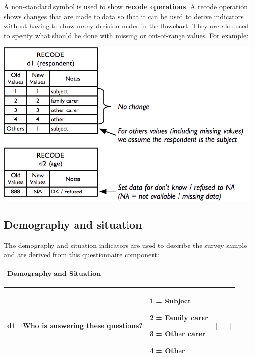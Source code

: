\documentclass[12pt,a4paper]{book}
\theoremstyle{definition}
\theoremstyle{definition}
\theoremstyle{definition}
\theoremstyle{remark}
\begin{document}
A non-standard symbol is used to show \textbf{recode operations}. A
recode operation shows changes that are made to data so that it can be
used to derive indicators without having to show many decision nodes in
the flowchart. They are also used to specify what should be done with
missing or out-of-range values. For example:

\begin{center}\includegraphics{figures/indicators02} \end{center}

\hypertarget{demography-and-situation}{%
\subsection{Demography and situation}\label{demography-and-situation}}

The demography and situation indicators are used to describe the survey
sample and are derived from this questionnaire component:

\begin{longtable}[]{@{}c@{}}
\toprule
\begin{minipage}[t]{0.97\columnwidth}\centering
\textbf{Demography and Situation}\strut
\end{minipage}\tabularnewline
\bottomrule
\end{longtable}

\begin{longtable}[]{@{}llll@{}}
\toprule
\begin{minipage}[t]{0.24\columnwidth}\raggedright
d1\strut
\end{minipage} & \begin{minipage}[t]{0.24\columnwidth}\raggedright
Who is answering these questions?\strut
\end{minipage} & \begin{minipage}[t]{0.24\columnwidth}\raggedright
1 = Subject

2 = Family carer

3 = Other carer

4 = Other\strut
\end{minipage} & \begin{minipage}[t]{0.24\columnwidth}\raggedright
{[}\_\_{]}\strut
\end{minipage}\tabularnewline
\bottomrule
\end{longtable}
\end{document}
